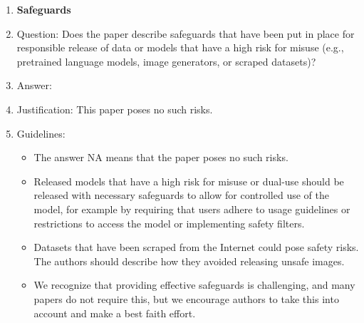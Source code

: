 \documentclass{article}
\begin{document}
\begin{enumerate}
\item {\bf Safeguards}
    \item[] Question: Does the paper describe safeguards that have been put in place for responsible release of data or models that have a high risk for misuse (e.g., pretrained language models, image generators, or scraped datasets)?
    \item[] Answer: \answerNA{} %
    \item[] Justification: This paper poses no such risks.
    \item[] Guidelines:
    \begin{itemize}
        \item The answer NA means that the paper poses no such risks.
        \item Released models that have a high risk for misuse or dual-use should be released with necessary safeguards to allow for controlled use of the model, for example by requiring that users adhere to usage guidelines or restrictions to access the model or implementing safety filters. 
        \item Datasets that have been scraped from the Internet could pose safety risks. The authors should describe how they avoided releasing unsafe images.
        \item We recognize that providing effective safeguards is challenging, and many papers do not require this, but we encourage authors to take this into account and make a best faith effort.
    \end{itemize}


\end{enumerate}
\end{document}
